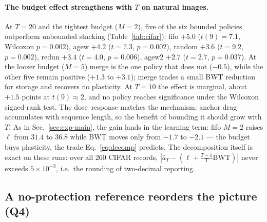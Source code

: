 \documentclass[review,12pt,number]{elsarticle}
\begin{document}
\begin{sloppypar}
\paragraph{The budget effect strengthens with $T$ on natural images.}
At $T{=}20$ and the tightest budget ($M{=}2$), five of the six bounded
policies outperform unbounded stacking (Table~\ref{tab:cifar}): fifo $+5.0$
($t(9){=}7.1$, Wilcoxon $p{=}0.002$), agew $+4.2$ ($t{=}7.3$, $p{=}0.002$),
random $+3.6$ ($t{=}9.2$, $p{=}0.002$), redun $+3.4$ ($t{=}4.0$,
$p{=}0.006$), agew2 $+2.7$ ($t{=}2.7$, $p{=}0.037$).
At the looser budget ($M{=}5$) merge is the one policy that does not
($-0.5$), while the other five remain positive ($+1.3$ to $+3.1$); merge
trades a small BWT reduction for storage and recovers no plasticity.
At $T{=}10$ the effect is marginal, about $+1.5$ points at
$t(9)\approx 2$, and no policy reaches significance under the Wilcoxon
signed-rank test.
The dose--response matches the mechanism: anchor drag accumulates
with sequence length, so the benefit of bounding it should grow with
$T$. As in Sec.~\ref{sec:exp-main}, the gain lands in the learning
term: fifo $M{=}2$ raises $\ell$ from $31.4$ to $36.8$ while BWT
moves only from $-1.7$ to $-2.1$ --- the budget buys plasticity, the
trade Eq.~\ref{eq:decomp} predicts. The decomposition itself is exact
on these runs: over all 260 CIFAR records,
$|\bar a_T - (\ell + \frac{T-1}{T}\mathrm{BWT})|$ never exceeds
$5\times10^{-3}$, i.e.\ the rounding of two-decimal reporting.
\end{sloppypar}

\subsection{A no-protection reference reorders the picture (Q4)}
\label{sec:exp-noprot}
\end{document}
